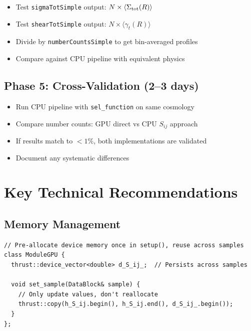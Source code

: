 \documentclass[a4paper, 11pt]{article}
\begin{document}
\begin{itemize}
  \item[$\square$] Test \texttt{sigmaTotSimple} output: $N \times \langle\Sigma_{\rm tot}(R)\rangle$
  \item[$\square$] Test \texttt{shearTotSimple} output: $N \times \langle\gamma_t(R)\rangle$
  \item[$\square$] Divide by \texttt{numberCountsSimple} to get bin-averaged profiles
  \item[$\square$] Compare against CPU pipeline with equivalent physics
\end{itemize}

\subsection{Phase 5: Cross-Validation (2--3 days)}

\begin{itemize}
  \item[$\square$] Run CPU pipeline with \texttt{sel\_function} on same cosmology
  \item[$\square$] Compare number counts: GPU direct vs CPU $S_{ij}$ approach
  \item[$\square$] If results match to $<1\%$, both implementations are validated
  \item[$\square$] Document any systematic differences
\end{itemize}

\section{Key Technical Recommendations}
\label{sec:technical}

\subsection{Memory Management}

\begin{lstlisting}
// Pre-allocate device memory once in setup(), reuse across samples
class ModuleGPU {
  thrust::device_vector<double> d_S_ij_;  // Persists across samples

  void set_sample(DataBlock& sample) {
    // Only update values, don't reallocate
    thrust::copy(h_S_ij.begin(), h_S_ij.end(), d_S_ij_.begin());
  }
};
\end{lstlisting}
\end{document}
